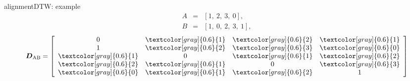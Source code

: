         \begin{frame}{alignment}{DTW: example}
                    \begin{eqnarray*}
                        A &=& [1,\ 2,\ 3,\ 0] ,\nonumber\\
                        B &=& [1,\ 0,\ 2,\ 3,\ 1] ,\nonumber
                    \end{eqnarray*}
                    \pause
                    \begin{equation*}
                    \mat{D}_{\mathrm{AB}} =   \left[ 
                                    \begin{array}{cccc}
                                    0							&	\textcolor[gray]{0.6}{1}	&	\textcolor[gray]{0.6}{2}	&	\textcolor[gray]{0.6}{1}\\
                                    1							&	\textcolor[gray]{0.6}{2}	&	\textcolor[gray]{0.6}{3}	&	\textcolor[gray]{0.6}{0}\\
                                    \textcolor[gray]{0.6}{1}	&	0 							&	\textcolor[gray]{0.6}{1}	&	\textcolor[gray]{0.6}{2}\\
                                    \textcolor[gray]{0.6}{2}	&	\textcolor[gray]{0.6}{1}	&	0							&	\textcolor[gray]{0.6}{3}\\
                                    \textcolor[gray]{0.6}{0}	&	\textcolor[gray]{0.6}{1}	&	\textcolor[gray]{0.6}{2}	&	1\\
                                \end{array}  
                            \right]  
                    \end{equation*}
        \end{frame}

